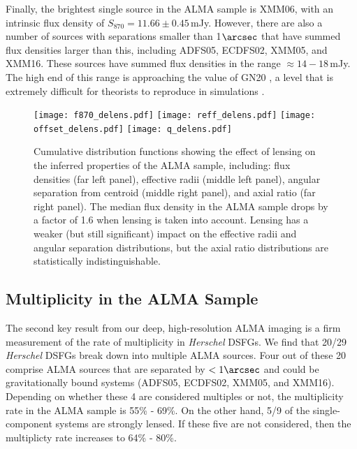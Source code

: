 \documentclass[iop]{emulateapj}
\begin{document}
Finally, the brightest single source in the ALMA sample is XMM06, with an
intrinsic flux density of $S_{870} = 11.66 \pm 0.45\,$mJy.  However, there are
also a number of sources with separations smaller than 1$\arcsec$ that have
summed flux densities larger than this, including ADFS05, ECDFS02, XMM05, and
XMM16.  These sources have summed flux densities in the range $\approx
14-18\,$mJy.  The high end of this range is approaching the value of GN20
\citep[20.6$\,$mJy,][]{2006MNRAS.370.1185P}, a level that is extremely
difficult for theorists to reproduce in simulations
\citep[e.g.,][]{Narayanan:2010lr}.

\begin{figure*}[!tbp] 
\texttt{[image: f870\_delens.pdf]}
\texttt{[image: reff\_delens.pdf]}
\texttt{[image: offset\_delens.pdf]}
\texttt{[image: q\_delens.pdf]}

\caption{ Cumulative distribution functions showing the effect of lensing on
the inferred properties of the ALMA sample, including: flux densities (far left
panel), effective radii (middle left panel), angular separation from centroid
(middle right panel), and axial ratio (far right panel).  The median flux
density in the ALMA sample drops by a factor of 1.6 when lensing is taken into
account.  Lensing has a weaker (but still significant) impact on the effective
radii and angular separation distributions, but the axial ratio distributions
are statistically indistinguishable.} \label{fig:delens}

\end{figure*}

\subsection{Multiplicity in the ALMA Sample}\label{sec:multiplicity}

The second key result from our deep, high-resolution ALMA imaging is a firm
measurement of the rate of multiplicity in {\it Herschel} DSFGs.  We find that
20/29 {\it Herschel} DSFGs break down into multiple ALMA sources.  Four out of
these 20 comprise ALMA sources that are separated by $<1\arcsec$ and could be
gravitationally bound systems (ADFS05, ECDFS02, XMM05, and XMM16).  Depending
on whether these 4 are considered multiples or not, the multiplicity rate in
the ALMA sample is 55\% - 69\%.  On the other hand, 5/9 of the single-component
systems are strongly lensed.  If these five are not considered, then the
multiplicty rate increases to 64\% - 80\%.  
\end{document}
